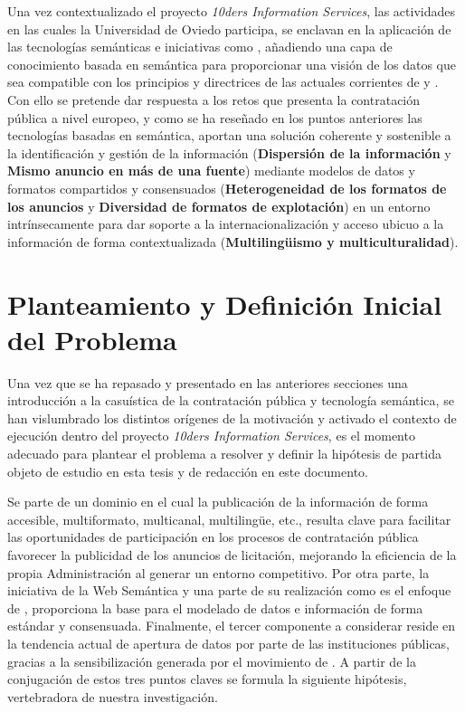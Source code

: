 Una vez contextualizado el proyecto \textit{10ders Information Services}, las actividades en las cuales
la Universidad de Oviedo participa, se enclavan en la aplicación de las tecnologías semánticas
e iniciativas como \linkeddata, añadiendo una capa de conocimiento basada en semántica para proporcionar
una visión de los datos que sea compatible con los principios y directrices de las 
actuales corrientes de \opendata y \linkeddata. Con ello se pretende dar respuesta a los retos
que presenta la contratación pública a nivel europeo, y como se ha reseñado en los puntos anteriores las tecnologías
basadas en semántica, aportan una solución coherente y sostenible a la identificación y gestión de la información 
(\textbf{Dispersión de la información} y \textbf{Mismo anuncio en más de una fuente}) mediante modelos de datos y formatos
compartidos y consensuados (\textbf{Heterogeneidad de los formatos de los anuncios} y \textbf{Diversidad de formatos de explotación}) en un entorno
intrínsecamente para dar soporte a la internacionalización y acceso ubicuo a la información de forma
contextualizada (\textbf{Multilingüismo y multiculturalidad}).

\section{Planteamiento y Definición Inicial del Problema}
Una vez que se ha repasado y presentado en las anteriores secciones una introducción a la casuística de la contratación
pública y tecnología semántica, se han vislumbrado los distintos orígenes de la motivación y activado el contexto
de ejecución dentro del proyecto \textit{10ders Information Services}, es el momento adecuado para plantear
el problema a resolver y definir la hipótesis de partida objeto de estudio en esta tesis y de redacción
en este documento.

Se parte de un dominio en el cual la publicación de la información de forma accesible, multiformato, multicanal, multiling\"{u}e, etc., 
resulta clave para facilitar las oportunidades de participación en los procesos de contratación pública favorecer la publicidad
de los anuncios de licitación, mejorando la eficiencia de la propia Administración al generar un entorno
competitivo. Por otra parte, la iniciativa de la Web Semántica y una parte de su realización como es el enfoque
de \linkeddata, proporciona la base para el modelado de datos e información de forma estándar y consensuada. Finalmente, el tercer
componente a considerar reside en la tendencia actual de apertura de datos por parte de las instituciones públicas, gracias
a la sensibilización generada por el movimiento de \opendata. A partir de la conjugación de estos tres puntos claves se formula
la siguiente hipótesis, vertebradora de nuestra investigación.

